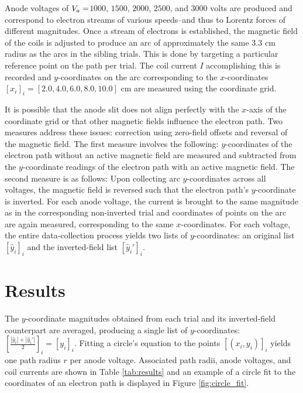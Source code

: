 \documentclass[11pt]{article}
\begin{document}
Anode voltages of $V_a = \space $\space  $1000$, $1500$, $2000$,
$2500$, and $3000$
volts are produced
and correspond to electron streams of various speeds--and thus to
Lorentz forces of different magnitudes. Once a stream
of electrons is established, the magnetic field of the coils is adjusted to
produce an arc of approximately the same $3.3$ cm radius as the arcs
in the sibling trials. This is done by targeting a particular
reference point on the path per trial. The coil current $I$
accomplishing this is recorded and $y$-coordinates on the arc
corresponding to the $x$-coordinates $[x_i]_i = [2.0,
4.0, 6.0, 8.0, 10.0]$ cm are measured using the coordinate grid.

\vspace{1em}



It is possible that the anode slit does not align perfectly with the
$x$-axis of the coordinate grid or that other magnetic fields influence
the electron path. Two measures address these issues: correction using
zero-field offsets and reversal of the magnetic field.
The first measure involves the following: $y$-coordinates of the
electron path
without an active magnetic field are measured and
subtracted from the $y$-coordinate readings of the electron path with an
active magnetic field. The second measure is as follows: Upon
collecting arc $y$-coordinates across all voltages, the magnetic field is
reversed such that the electron path's $y$-coordinate is inverted. For each
anode voltage, the current is brought to the same magnitude as
in the corresponding non-inverted trial and coordinates of points on the
arc are again measured, corresponding to the same $x$-coordinates.
For each voltage, the entire data-collection process yields two lists
of $y$-coordinates: an original list $[\hat y_i]_i$ and the
inverted-field list $[\hat y_i']_i$.

\section{Results}

The $y$-coordinate magnitudes obtained from each trial and its
inverted-field counterpart are averaged, producing a single list of
$y$-coordinates:
$\left [ \frac{|\hat y_i| + |\hat y_i'|}{2} \right ]_i = \left [ y_i
\right ]_i$. Fitting a
circle's equation to the points $\left [ (x_i, y_i) \right ]_i$
yields one path radius
$r$ per anode voltage. Associated path radii, anode voltages,
and coil currents are shown in Table \ref{tab:results} and an example
of a circle fit to the coordinates of an electron path is displayed in Figure
\ref{fig:circle_fit}.
\end{document}
